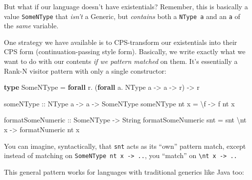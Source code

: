 \documentclass[]{article}
\newenvironment{Shaded}{}{}
\newcommand{\DataTypeTok}[1]{\textcolor[rgb]{0.56,0.13,0.00}{#1}}
\newcommand{\KeywordTok}[1]{\textcolor[rgb]{0.00,0.44,0.13}{\textbf{#1}}}
\newcommand{\NormalTok}[1]{#1}
\newcommand{\OperatorTok}[1]{\textcolor[rgb]{0.40,0.40,0.40}{#1}}
\newcommand{\OtherTok}[1]{\textcolor[rgb]{0.00,0.44,0.13}{#1}}
\begin{document}
But what if our language doesn't have existentials? Remember, this is basically
a value \texttt{SomeNType} that \emph{isn't} a Generic, but \emph{contains} both
a \texttt{NType\ a} and an \texttt{a} of the \emph{same} variable.

One strategy we have available is to CPS-transform our existentials into their
CPS form (continuation-passing style form). Basically, we write exactly what we
want to do with our contents \emph{if we pattern matched} on them. It's
essentially a Rank-N visitor pattern with only a single constructor:

\begin{Shaded}
\begin{Highlighting}[]
\KeywordTok{type} \DataTypeTok{SomeNType} \OtherTok{=} \KeywordTok{forall}\NormalTok{ r}\OperatorTok{.}\NormalTok{ (}\KeywordTok{forall}\NormalTok{ a}\OperatorTok{.} \DataTypeTok{NType}\NormalTok{ a }\OtherTok{{-}\textgreater{}}\NormalTok{ a }\OtherTok{{-}\textgreater{}}\NormalTok{ r) }\OtherTok{{-}\textgreater{}}\NormalTok{ r}

\OtherTok{someNType ::} \DataTypeTok{NType}\NormalTok{ a }\OtherTok{{-}\textgreater{}}\NormalTok{ a }\OtherTok{{-}\textgreater{}} \DataTypeTok{SomeNType}
\NormalTok{someNType nt x }\OtherTok{=}\NormalTok{ \textbackslash{}f }\OtherTok{{-}\textgreater{}}\NormalTok{ f nt x}

\OtherTok{formatSomeNumeric ::} \DataTypeTok{SomeNType} \OtherTok{{-}\textgreater{}} \DataTypeTok{String}
\NormalTok{formatSomeNumeric snt }\OtherTok{=}\NormalTok{ snt}
\NormalTok{    \textbackslash{}nt x }\OtherTok{{-}\textgreater{}}\NormalTok{ formatNumeric nt x}
\end{Highlighting}
\end{Shaded}

You can imagine, syntactically, that \texttt{snt} acts as its ``own'' pattern
match, except instead of matching on
\texttt{SomeNType\ nt\ x\ -\textgreater{}\ ..}, you ``match'' on
\texttt{\textbackslash{}nt\ x\ -\textgreater{}\ ..}

This general pattern works for languages with traditional generics like Java
too:
\end{document}
